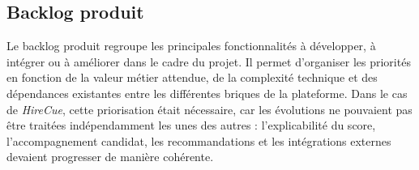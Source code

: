\subsection{Backlog produit}

Le backlog produit regroupe les principales fonctionnalités à développer, à intégrer ou à améliorer dans le cadre du projet. Il permet d'organiser les priorités en fonction de la valeur métier attendue, de la complexité technique et des dépendances existantes entre les différentes briques de la plateforme. Dans le cas de \textit{HireCue}, cette priorisation était nécessaire, car les évolutions ne pouvaient pas être traitées indépendamment les unes des autres : l'explicabilité du score, l'accompagnement candidat, les recommandations et les intégrations externes devaient progresser de manière cohérente.

